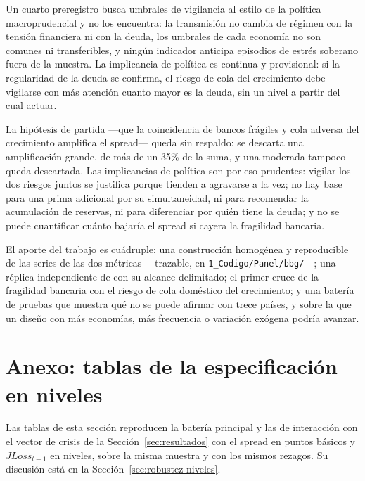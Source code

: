 Un cuarto preregistro busca umbrales de vigilancia al estilo de la política macroprudencial y no los encuentra: la transmisión no cambia de régimen con la tensión financiera ni con la deuda, los umbrales de cada economía no son comunes ni transferibles, y ningún indicador anticipa episodios de estrés soberano fuera de la muestra. La implicancia de política es continua y provisional: si la regularidad de la deuda se confirma, el riesgo de cola del crecimiento debe vigilarse con más atención cuanto mayor es la deuda, sin un nivel a partir del cual actuar.

La hipótesis de partida ---que la coincidencia de bancos frágiles y cola adversa del crecimiento amplifica el spread--- queda sin respaldo: se descarta una amplificación grande, de más de un 35\% de la suma, y una moderada tampoco queda descartada. Las implicancias de política son por eso prudentes: vigilar los dos riesgos juntos se justifica porque tienden a agravarse a la vez; no hay base para una prima adicional por su simultaneidad, ni para recomendar la acumulación de reservas, ni para diferenciar por quién tiene la deuda; y no se puede cuantificar cuánto bajaría el spread si cayera la fragilidad bancaria.

El aporte del trabajo es cuádruple: una construcción homogénea y reproducible de las series de las dos métricas ---trazable, en \texttt{1\_Codigo/Panel/bbg/}---; una réplica independiente de \citet{Chari2024b} con su alcance delimitado; el primer cruce de la fragilidad bancaria con el riesgo de cola doméstico del crecimiento; y una batería de pruebas que muestra qué no se puede afirmar con trece países, y sobre la que un diseño con más economías, más frecuencia o variación exógena podría avanzar.

\section*{Anexo: tablas de la especificación en niveles}
\label{sec:anexo-niveles}

Las tablas de esta sección reproducen la batería principal y las de interacción con el vector de crisis de la Sección~\ref{sec:resultados} con el spread en puntos básicos y $JLoss_{t-1}$ en niveles, sobre la misma muestra y con los mismos rezagos. Su discusión está en la Sección~\ref{sec:robustez-niveles}.




